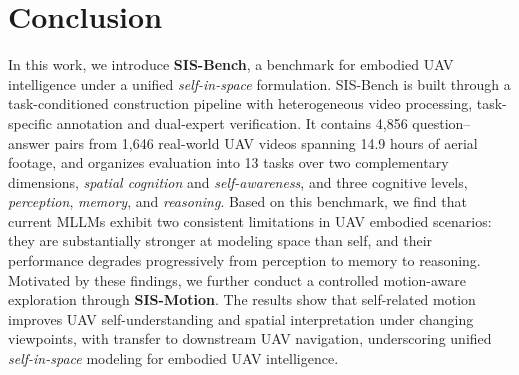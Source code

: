 \documentclass[sigconf, screen, review, anonymous]{acmart}
\begin{document}
\section{Conclusion}

In this work, we introduce \textbf{SIS-Bench}, a benchmark for embodied UAV intelligence under a unified \emph{self-in-space} formulation. SIS-Bench is built through a task-conditioned construction pipeline with heterogeneous video processing, task-specific annotation and dual-expert verification. It contains 4,856 question--answer pairs from 1,646 real-world UAV videos spanning 14.9 hours of aerial footage, and organizes evaluation into 13 tasks over two complementary dimensions, \emph{spatial cognition} and \emph{self-awareness}, and three cognitive levels, \emph{perception}, \emph{memory}, and \emph{reasoning}. Based on this benchmark, we find that current MLLMs exhibit two consistent limitations in UAV embodied scenarios: they are substantially stronger at modeling space than self, and their performance degrades progressively from perception to memory to reasoning. Motivated by these findings, we further conduct a controlled motion-aware exploration through \textbf{SIS-Motion}. The results show that self-related motion improves UAV self-understanding and spatial interpretation under changing viewpoints, with transfer to downstream UAV navigation, underscoring unified \emph{self-in-space} modeling for embodied UAV intelligence.






\end{document}
